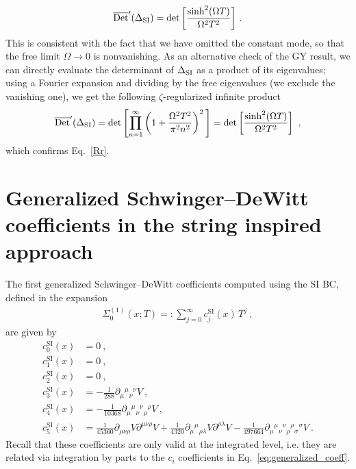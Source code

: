 \documentclass[12pt,a4paper]{article}
\numberwithin{equation}{section}
\numberwithin{equation}{section}
\begin{document}
\begin{equation} \label{Rr}
{\overline{\mathrm{Det}}'(\Delta_{\rm SI})=\mathrm{det}\left[ \frac{\sinh^2(\Omega T)}{\Omega^2T^2} \right]}\ .
\end{equation}
This is consistent with the fact that we have omitted the constant mode, so that the free limit $\Omega\to 0$ is nonvanishing. As an alternative check of the GY result, we can directly evaluate the determinant of $\Delta_{\rm SI}$ as a product of its eigenvalues; using a Fourier expansion and dividing by the free eigenvalues (we exclude the vanishing one), we get the following $\zeta$-regularized infinite product
\begin{equation} \label{B.48}
 \overline{\mathrm{Det}}'
 (\Delta_{\rm SI})= \mathrm{det}\left[ \prod\limits_{n =1}^{\infty} \left( 1+\frac{\Omega^2T^2}{\pi^2n^2} \right)^2 \, \right]=\mathrm{det}\left[ \frac{\sinh^2(\Omega T)}{\Omega^2 T^2} \right]\ ,
\end{equation}
which confirms Eq.~\eqref{Rr}.


\section{Generalized Schwinger--DeWitt coefficients in the string inspired approach}\label{app:coeff_SI}
The first generalized Schwinger--DeWitt coefficients computed using the SI BC, defined in the expansion
\begin{align}
    \Sigma^{(1)}_0({x};T) =:\sum_{j=0}^{\infty} c^{\mathrm{SI}}_j(x) \, T^{j}\ ,
\end{align}
are given by
\begin{align}
c^{\mathrm{SI}}_0(x)&=0\ , \\
c^{\mathrm{SI}}_1(x)&=0\ , \\
c^{\mathrm{SI}}_2(x)&=0\ , \\
c^{\mathrm{SI}}_3(x)&=-\frac{1}{288}\partial_{\mu}{}^{\mu}{}_{\nu}{}^{\nu} V  \ ,
\\
c^{\mathrm{SI}}_4(x)&=-\frac{1}{10368}\partial_{\mu}{}^\mu{}_\nu{}^\nu{}_\rho{}^\rho V \ ,
\\
c^{\mathrm{SI}}_5(x)&= 
\frac{1}{45360} \partial_{\mu\nu\rho} V \partial^{\mu\nu\rho} V  
+ \frac{1}{4320} \partial_{\mu}{}^{\mu}{}_{\rho\lambda} V \partial^{\rho\lambda} V 
-\frac{1}{497664}\partial_{\mu}{}^\mu{}_\nu{}^\nu{}_\rho{}^\rho{}_\sigma{}^\sigma V  \ .
\end{align}
Recall that these coefficients are only valid  at the integrated level, i.e. they are related via integration by parts to the $c_i$ coefficients in Eq.~\eqref{eq:generalized_coeff}.




\end{document}

